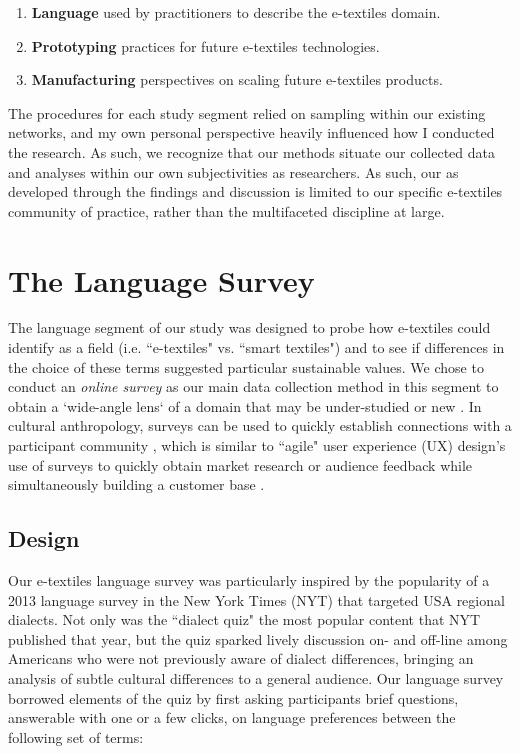 \begin{enumerate}
  \item \textbf{Language} used by practitioners to describe the e-textiles domain.
  \item \textbf{Prototyping} practices for future e-textiles technologies. 
  \item \textbf{Manufacturing} perspectives on scaling future e-textiles products.
\end{enumerate}

The procedures for each study segment relied on sampling within our existing networks, and my own personal perspective heavily influenced how I conducted the research. As such, we recognize that
our methods situate our collected data and analyses within our own subjectivities as researchers. As such, our  as developed through the findings and discussion is limited to our specific e-textiles community of practice, rather than the multifaceted discipline at large.

\section{The Language Survey}

The language segment of our study was designed to probe how e-textiles could identify as a field (i.e. ``e-textiles" vs. ``smart textiles") and to see if differences in the choice of these terms suggested particular sustainable values.
We chose to conduct an \textit{online survey} as our main data collection method in this segment to obtain a `wide-angle lens` of a domain that may be under-studied or new \cite{braun_online_2020}.  
In cultural anthropology, surveys can be used to quickly establish connections with a participant community \cite{bernard_handbook_2014}, which is similar to ``agile" user experience (UX) design's use of surveys to quickly obtain market research or audience feedback while simultaneously building a customer base \cite{buley_user_2013}. 

\subsection{Design}

Our e-textiles language survey was particularly inspired by the popularity of a 2013 language survey
in the New York Times (NYT) \cite{katz_how_2013} that targeted USA regional dialects. Not only was the ``dialect quiz" the most popular content that NYT published that year, but the quiz sparked lively discussion on- and off-line among Americans who were not previously aware of dialect differences, bringing an analysis of subtle cultural differences to a general audience. Our language survey borrowed elements of the quiz by first asking participants brief questions, answerable with one or a few clicks, on language preferences between the following set of terms:

